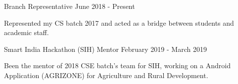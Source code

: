

\begin{cventries}

  \projects
    {} %
    {Branch Representative} %
    {June 2018 - Present} %
    {} %
    {
      \begin{por} %
        \item []{Represented my CS batch 2017 and acted as a bridge between students and academic staff.}
      \end{por}
    }

\projects
    {} %
    {Smart India Hackathon (SIH) Mentor} %
    {February 2019 - March 2019} %
    {} %
    {
      \begin{por} %
        \item []{Been the mentor of 2018 CSE batch's team for SIH, working on a Android Application (AGRIZONE) for Agriculture and Rural Development.}
      \end{por}
    }

\end{cventries}
